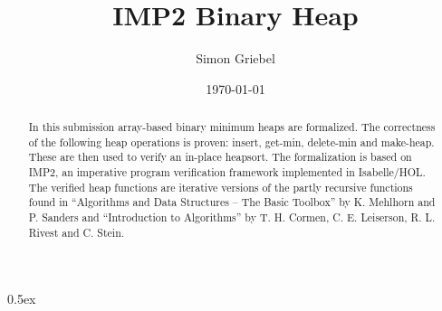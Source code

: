 \documentclass[11pt,a4paper]{article}
\begin{document}
\title{IMP2 Binary Heap}
\author{Simon Griebel}
\date{\today}
\maketitle
\begin{abstract}
In this submission array-based binary minimum heaps are formalized. The correctness of the following heap operations is proven: \mbox{insert}, get-min, delete-min and make-heap. These are then used to verify an in-place heapsort. The formalization is based on IMP2, an imperative program verification framework implemented in Isabelle/HOL. The verified heap functions are iterative versions of the partly recursive functions found in ``Algorithms and Data Structures – The Basic Toolbox'' by  K. Mehlhorn and P. Sanders and ``Introduction to Algorithms'' by T. H. Cormen, C. E. Leiserson, R. L. Rivest and C. Stein.
\end{abstract}
\tableofcontents

\parindent 0pt\parskip 0.5ex
\newpage




\end{document}
